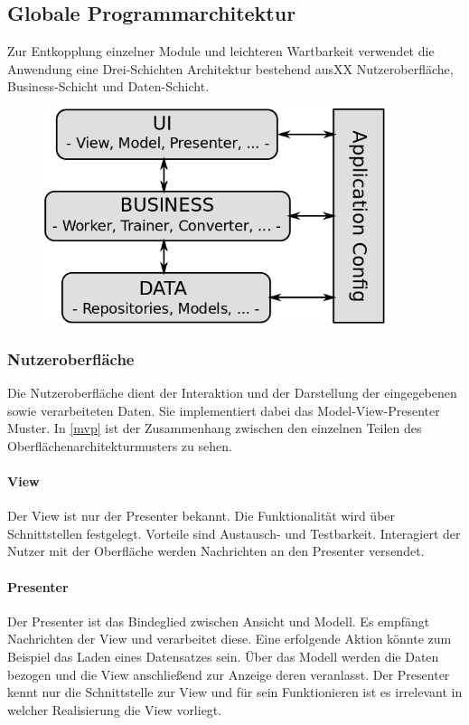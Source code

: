 \subsection{Globale Programmarchitektur}

Zur Entkopplung einzelner Module und leichteren Wartbarkeit verwendet die Anwendung eine Drei-Schichten Architektur bestehend ausXX	 Nutzeroberfläche, Business-Schicht und Daten-Schicht. 
\begin{figure}[H]
\begin{center}
\includegraphics[width=10cm]{Abbildungen/UML/jan/SchichtenModell.png}
\end{center}
\end{figure}

\subsubsection{Nutzeroberfläche}
Die Nutzeroberfläche dient der Interaktion und der Darstellung der eingegebenen sowie verarbeiteten Daten. Sie implementiert dabei das Model-View-Presenter Muster. In \ref{mvp} ist der Zusammenhang zwischen den einzelnen Teilen des Oberflächenarchitekturmusters zu sehen.

\paragraph{View} Der View ist nur der Presenter bekannt. Die Funktionalität wird über Schnittstellen festgelegt. Vorteile sind Austausch- und Testbarkeit. Interagiert der Nutzer mit der Oberfläche werden Nachrichten an den Presenter versendet.

\paragraph{Presenter} Der Presenter ist das Bindeglied zwischen Ansicht und Modell. Es empfängt Nachrichten der View und verarbeitet diese. Eine erfolgende Aktion könnte zum Beispiel das Laden eines Datensatzes sein. Über das Modell werden die Daten bezogen und die View anschließend zur Anzeige deren veranlasst. Der Presenter kennt nur die Schnittstelle zur View und für sein Funktionieren ist es irrelevant in welcher Realisierung die View vorliegt.

